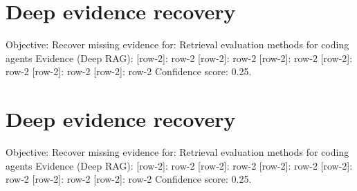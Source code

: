 \documentclass[conference]{IEEEtran}
\begin{document}
\section{Deep evidence recovery}
Objective: Recover missing evidence for: Retrieval evaluation methods for coding agents
Evidence (Deep RAG):
[row-2]: row-2
[row-2]: row-2
[row-2]: row-2
[row-2]: row-2
[row-2]: row-2
[row-2]: row-2
Confidence score: 0.25. \cite{t2_fake_1,t3_fake_1,f2_fake_1}

\section{Deep evidence recovery}
Objective: Recover missing evidence for: Retrieval evaluation methods for coding agents
Evidence (Deep RAG):
[row-2]: row-2
[row-2]: row-2
[row-2]: row-2
[row-2]: row-2
[row-2]: row-2
[row-2]: row-2
Confidence score: 0.25. \cite{f2_fake_1,t3_fake_1,t2_fake_2}

\
\

\
\end{document}
